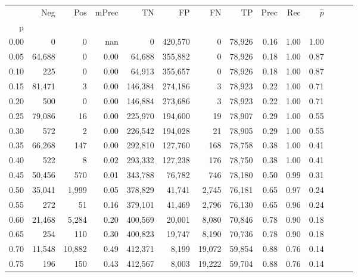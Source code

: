 \begin{tabular}{rrrrrrrrrrrrrr}
\toprule
{} &     Neg &     Pos & mPrec &       TN &       FP &      FN &      TP &  Prec &   Rec & $\hat{p}$ \\
p    &         &         &       &          &          &         &         &       &       &           \\
\midrule
0.00 &       0 &       0 &   nan &        0 &  420,570 &       0 &  78,926 &  0.16 &  1.00 &      1.00 \\
0.05 &  64,688 &       0 &  0.00 &   64,688 &  355,882 &       0 &  78,926 &  0.18 &  1.00 &      0.87 \\
0.10 &     225 &       0 &  0.00 &   64,913 &  355,657 &       0 &  78,926 &  0.18 &  1.00 &      0.87 \\
0.15 &  81,471 &       3 &  0.00 &  146,384 &  274,186 &       3 &  78,923 &  0.22 &  1.00 &      0.71 \\
0.20 &     500 &       0 &  0.00 &  146,884 &  273,686 &       3 &  78,923 &  0.22 &  1.00 &      0.71 \\
0.25 &  79,086 &      16 &  0.00 &  225,970 &  194,600 &      19 &  78,907 &  0.29 &  1.00 &      0.55 \\
0.30 &     572 &       2 &  0.00 &  226,542 &  194,028 &      21 &  78,905 &  0.29 &  1.00 &      0.55 \\
0.35 &  66,268 &     147 &  0.00 &  292,810 &  127,760 &     168 &  78,758 &  0.38 &  1.00 &      0.41 \\
0.40 &     522 &       8 &  0.02 &  293,332 &  127,238 &     176 &  78,750 &  0.38 &  1.00 &      0.41 \\
0.45 &  50,456 &     570 &  0.01 &  343,788 &   76,782 &     746 &  78,180 &  0.50 &  0.99 &      0.31 \\
0.50 &  35,041 &   1,999 &  0.05 &  378,829 &   41,741 &   2,745 &  76,181 &  0.65 &  0.97 &      0.24 \\
0.55 &     272 &      51 &  0.16 &  379,101 &   41,469 &   2,796 &  76,130 &  0.65 &  0.96 &      0.24 \\
0.60 &  21,468 &   5,284 &  0.20 &  400,569 &   20,001 &   8,080 &  70,846 &  0.78 &  0.90 &      0.18 \\
0.65 &     254 &     110 &  0.30 &  400,823 &   19,747 &   8,190 &  70,736 &  0.78 &  0.90 &      0.18 \\
0.70 &  11,548 &  10,882 &  0.49 &  412,371 &    8,199 &  19,072 &  59,854 &  0.88 &  0.76 &      0.14 \\
0.75 &     196 &     150 &  0.43 &  412,567 &    8,003 &  19,222 &  59,704 &  0.88 &  0.76 &      0.14 \\

\end{tabular}
